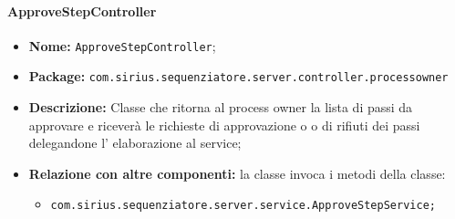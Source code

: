 \paragraph{ApproveStepController}
	\begin{itemize}
		\item \textbf{Nome:} \texttt{ApproveStepController};
		\item \textbf{Package:} \texttt{com.sirius.sequenziatore.server.controller.processowner}
		\item \textbf{Descrizione:} Classe che ritorna al process owner la lista di passi da approvare e riceverà le richieste di approvazione o o di rifiuti dei passi delegandone l' elaborazione al service;
		\item \textbf{Relazione con altre componenti:} la classe invoca i metodi della classe:
		\begin{itemize}
			\item \texttt{com.sirius.sequenziatore.server.service.ApproveStepService;}
		\end{itemize}
	\end{itemize}
